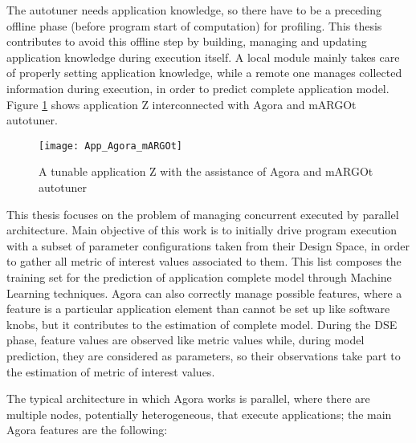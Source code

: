 The autotuner needs application knowledge, so there have to be a preceding offline phase (before program start of computation) for profiling. This thesis contributes to avoid this offline step by building, managing and updating application knowledge during execution itself. A local module mainly takes care of properly setting application knowledge, while a remote one manages collected information during execution, in order to predict complete application model. Figure \ref{fig::appAGORA} shows application Z interconnected with Agora and mARGOt autotuner.

\begin{figure}[H]

    \centering
    \texttt{[image: App\_Agora\_mARGOt]}
    \caption{A tunable application Z with the assistance of Agora and mARGOt autotuner}
    \label{fig::appAGORA}
    
\end{figure}

This thesis focuses on the problem of managing concurrent executed by parallel architecture. Main objective of this work is to initially drive program execution with a subset of parameter configurations taken from their Design Space, in order to gather all metric of interest values associated to them. This list composes the training set for the prediction of application complete model through Machine Learning techniques. Agora can also correctly manage possible features, where a feature is a particular application element than cannot be set up like software knobs, but it contributes to the estimation of complete model. During the DSE phase, feature values are observed like metric values while, during model prediction, they are considered as parameters, so their observations take part to the estimation of metric of interest values.

The typical architecture in which Agora works is parallel, where there are multiple nodes, potentially heterogeneous, that execute applications; the main Agora features are the following:

